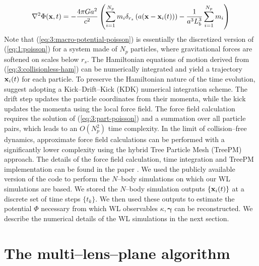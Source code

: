 \begin{equation}
\label{eq:3:macro-potential-poisson}
\nabla^2\Phi(\mathbf{x},t) = -\frac{4\pi Ga^2}{c^2}\left(\sum_{i=1}^{N_p}m_i\delta_{r_s}\left(a(\mathbf{x}-\mathbf{x}_i(t))\right)-\frac{1}{a^3L_b^3}\sum_{i=1}^{N_p}m_i\right)
\end{equation}
%
Note that (\ref{eq:3:macro-potential-poisson}) is essentially the discretized version of (\ref{eq:1:poisson}) for a system made of $N_p$ particles, where gravitational forces are softened on scales below $r_s$. The Hamiltonian equations of motion derived from (\ref{eq:3:collisionless-ham}) can be numerically integrated and yield a trajectory $\mathbf{x}_i(t)$ for each particle. To preserve the Hamiltonian nature of the time evolution, \citep{gadget2} suggest adopting a Kick--Drift--Kick (KDK) numerical integration scheme. The drift step updates the particle coordinates from their momenta, while the kick updates the momenta using the local force field. The force field calculation requires the solution of (\ref{eq:3:part-poisson}) and a summation over all particle pairs, which leads to an $O(N_p^2)$ time complexity. In the limit of collision--free dynamics, approximate force field calculations can be performed with a significantly lower complexity using the hybrid Tree Particle Mesh (TreePM) approach. The details of the force field calculation, time integration and TreePM implementation can be found in the  paper \citep{gadget2}. We used the publicly available version of the  code to perform the $N$--body simulations on which our WL simulations are based. We stored the $N$--body simulation outputs $\{\mathbf{x}_i(t)\}$ at a discrete set of time steps $\{t_k\}$. We then used these outputs to estimate the potential $\Phi$ necessary from which WL observables $\kappa,\pmb{\gamma}$ can be reconstructed. We describe the numerical details of the WL simulations in the next section.  


\section{The multi--lens--plane algorithm}

